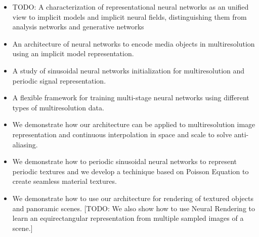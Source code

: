 \begin{itemize}
    \item TODO: A characterization of representational neural networks as an unified view to implicit models and implicit neural fields, distinguishing them from analysis networks and generative networks
    \item An architecture of neural networks to encode media objects in multiresolution using an implicit model representation.
    \item A study of sinusoidal neural networks initialization for multiresolution and periodic signal representation.
    \item A flexible framework for training multi-stage neural networks using different types of multiresolution data.
    \item We demonstrate how our architecture can be applied to multiresolution image representation and continuous interpolation in space and scale to solve anti-aliasing.
    \item We demonstrate how to periodic sinusoidal neural networks to represent periodic textures and we develop a techinique based on Poisson Equation to create seamless material textures.
    \item We demonstrate how to use our architecture for rendering of textured objects and panoramic scenes. [TODO: We also show how to use Neural Rendering to learn an equirectangular representation from multiple sampled images of a scene.]
\end{itemize}